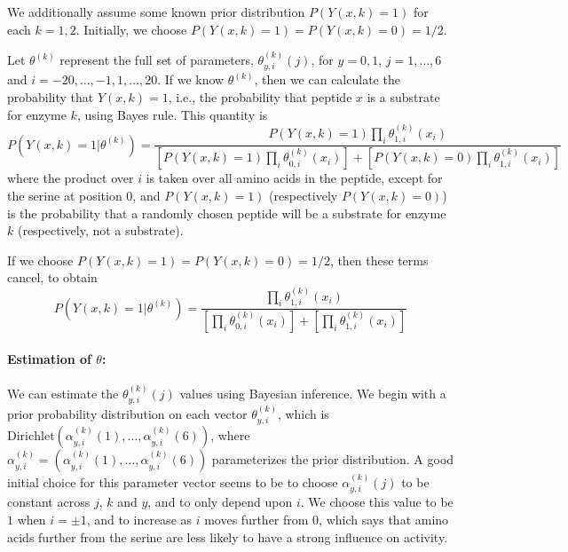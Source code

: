\documentclass[12pt]{article}
\begin{document}
We additionally assume some known prior distribution $P(Y(x,k)=1)$ for each $k=1,2$.
Initially, we choose $P(Y(x,k)=1) = P(Y(x,k)=0) = 1/2$.

Let $\theta^{(k)}$ represent the full set of parameters, $\theta^{(k)}_{y,i}(j)$, for $y=0,1$, $j=1,\ldots,6$ and $i=-20,\ldots,-1,1,\ldots,20$.
If we know $\theta^{(k)}$, then we can calculate the probability that
$Y(x,k)=1$, i.e., the probability that peptide $x$ is a substrate for enzyme
$k$, using Bayes rule.  This quantity is
\begin{equation} \label{eq:prob_Y_orig}
  P\left(Y(x,k) = 1 | \theta^{(k)}\right) =
  \frac{P(Y(x,k)=1) \prod_{i} \theta^{(k)}_{1,i}(x_i)}{
  \left[ P(Y(x,k)=1) \prod_{i} \theta^{(k)}_{0,i}(x_i)\right] +
  \left[ P(Y(x,k)=0) \prod_{i} \theta^{(k)}_{1,i}(x_i)\right]}
\end{equation}
where the product over $i$ is taken over all amino acids in the peptide, except for the serine at position $0$,
and $P(Y(x,k)=1)$ (respectively $P(Y(x,k)=0)$) is the probability that a randomly chosen peptide will be a substrate for enzyme $k$ (respectively, not a substrate).

If we choose $P(Y(x,k)=1) = P(Y(x,k)=0) = 1/2$, then these terms cancel, to obtain
\begin{equation}
  \label{eq:prob_Y}
  P\left(Y(x,k) = 1 | \theta^{(k)}\right) =
  \frac{\prod_{i} \theta^{(k)}_{1,i}(x_i)}{
  \left[ \prod_{i} \theta^{(k)}_{0,i}(x_i)\right] +
  \left[ \prod_{i} \theta^{(k)}_{1,i}(x_i)\right]}
\end{equation}

\paragraph{Estimation of $\theta$:}
We can estimate the $\theta^{(k)}_{y,i}(j)$ values using Bayesian inference.
We begin with a prior probability distribution on each vector $\theta^{(k)}_{y,i}$, which is $\mathrm{Dirichlet}(\alpha^{(k)}_{y,i}(1),\ldots,\alpha^{(k)}_{y,i}(6))$,
where $\alpha^{(k)}_{y,i} = (\alpha^{(k)}_{y,i}(1),\ldots,\alpha^{(k)}_{y,i}(6))$ parameterizes the prior distribution.
A good initial choice for this parameter vector seems to be to choose
$\alpha^{(k)}_{y,i}(j)$ to be constant across $j$, $k$ and $y$, and to only depend upon $i$.
We choose this value to be $1$ when $i=\pm1$, and to increase as $i$ moves further from $0$, which says that amino acids further from the serine are less likely to have a strong influence on activity.
\end{document}
